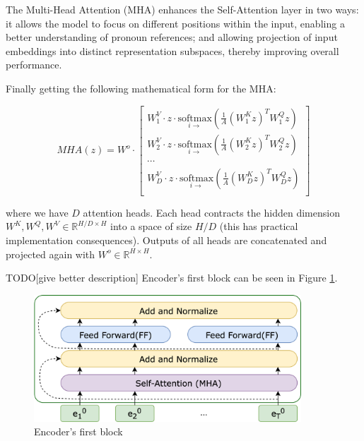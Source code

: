 The Multi-Head Attention ($\mathrm{MHA}$) enhances the Self-Attention layer in two ways: it allows the model to focus on different positions within the input, enabling a better understanding of pronoun references; and allowing projection of input embeddings into distinct representation subspaces, thereby improving overall performance.

\noindent Finally getting the following mathematical form for the $\mathrm{MHA}$:


\begin{equation}
MHA(z) =  W^o \cdot
\begin{bmatrix}
    W^V_1 \cdot z \cdot \underset{i \rightarrow}{\mathrm{softmax}}\left( \frac{1}{A} \left(W^K_1 z\right)^T W^Q_1 z \right)\\
    W^V_2 \cdot z \cdot \underset{i \rightarrow}{\mathrm{softmax}}\left( \frac{1}{A} \left(W^K_2 z\right)^T W^Q_2 z \right)\\
    \cdots\\
    W^V_D \cdot z \cdot \underset{i \rightarrow}{\mathrm{softmax}}\left( \frac{1}{A} \left(W^K_D z\right)^T W^Q_D z \right)\\
\end{bmatrix}\nonumber
\end{equation}

where we have $D$ attention heads. Each head contracts the hidden dimension $W^K, W^Q, W^V \in \mathbb{R}^{H / D \times H}$ into a space of size $H / D$ (this has practical implementation consequences). Outputs of all heads are concatenated and projected again with $W^o \in \mathbb{R}^{H \times H}$.

TODO[give better description] Encoder's first block can be seen in Figure \ref{fig:encoder_block}.

\begin{figure}[h]
    \centering
    \includegraphics[width=10cm]{pages/imgs/encoder_block.png}
    \caption{Encoder's first block}
    \label{fig:encoder_block}
\end{figure}




